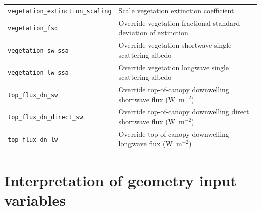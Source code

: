\documentclass[a4,oneside]{article}
\def\codetabsize{\footnotesize}
\def\codetab#1{{\codetabsize\texttt{#1}}}
\begin{document}
{\begin{longtable}{ll}
\codetab{vegetation\_extinction\_scaling} & Scale vegetation extinction coefficient\\
\codetab{vegetation\_fsd} & Override vegetation fractional standard deviation of extinction\\
\codetab{vegetation\_sw\_ssa} & Override vegetation shortwave single scattering albedo \\
\codetab{vegetation\_lw\_ssa} & Override vegetation longwave single scattering albedo \\
\codetab{top\_flux\_dn\_sw} & Override top-of-canopy downwelling shortwave flux (W~m$^{-2}$)\\
\codetab{top\_flux\_dn\_direct\_sw} & Override top-of-canopy downwelling direct shortwave flux (W~m$^{-2}$)\\
\codetab{top\_flux\_dn\_lw} & Override top-of-canopy downwelling longwave flux (W~m$^{-2}$)\\
\hline
\end{longtable}
}

\section{Interpretation of geometry input variables}
\end{document}
